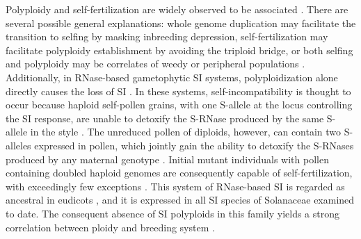 Polyploidy and self-fertilization are widely observed to be associated \citep{stebbins1950}.
There are several possible general explanations: whole genome duplication may facilitate the transition to selfing by masking inbreeding depression, self-fertilization may facilitate polyploidy establishment by avoiding the triploid bridge, or both selfing and polyploidy may be correlates of weedy or peripheral populations \citep{ramsey_1998, barringer2007, barrett2008, husband2008}.
Additionally, in RNase-based gametophytic SI systems, polyploidization alone directly causes the loss of SI \citep{stout1942, lewis1947}. %
In these systems, self-incompatibility is thought to occur because haploid self-pollen grains, with one S-allele at the locus controlling the SI response, are unable to detoxify the S-RNase produced by the same S-allele in the style \citep{kubo2010}.
The unreduced pollen of diploids, however, can contain two S-alleles expressed in pollen, which jointly gain the ability to detoxify the S-RNases produced by any maternal genotype \citep{entani1999, tsukamoto2005, kubo2010}.
Initial mutant individuals with pollen containing doubled haploid genomes are consequently capable of self-fertilization, with exceedingly few exceptions \citep{hauck_2002, nunes_2006}. %
This system of RNase-based SI is regarded as ancestral in eudicots \citep{igic_2001,steinbachs_2002}, and it is expressed in all SI species of Solanaceae examined to date.
The consequent absence of SI polyploids in this family yields a strong correlation between ploidy and breeding system \citep{robertson_2011}.

